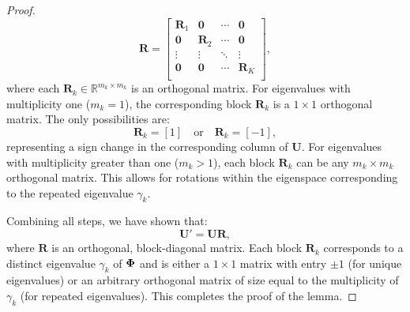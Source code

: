 \begin{proof}
    \[
        \mathbf{R} = \begin{bmatrix}
            \mathbf{R}_1 & \mathbf{0} & \cdots & \mathbf{0} \\
            \mathbf{0} & \mathbf{R}_2 & \cdots & \mathbf{0} \\
            \vdots & \vdots & \ddots & \vdots \\
            \mathbf{0} & \mathbf{0} & \cdots & \mathbf{R}_K \\
        \end{bmatrix},
    \]
    where each \( \mathbf{R}_k \in \mathbb{R}^{m_k \times m_k} \) is an orthogonal matrix. For eigenvalues with multiplicity one (\( m_k = 1 \)), the corresponding block \( \mathbf{R}_k \) is a \( 1 \times 1 \) orthogonal matrix. The only possibilities are:
    \[
        \mathbf{R}_k = [1] \quad \text{or} \quad \mathbf{R}_k = [-1],
    \]
    representing a sign change in the corresponding column of \( \mathbf{U} \). For eigenvalues with multiplicity greater than one (\( m_k > 1 \)), each block \( \mathbf{R}_k \) can be any \( m_k \times m_k \) orthogonal matrix. This allows for rotations within the eigenspace corresponding to the repeated eigenvalue \( \gamma_k \).
    
    Combining all steps, we have shown that:
    \[
        \mathbf{U}' = \mathbf{U} \mathbf{R},
    \]
    where \( \mathbf{R} \) is an orthogonal, block-diagonal matrix. Each block \( \mathbf{R}_k \) corresponds to a distinct eigenvalue \( \gamma_k \) of \( \boldsymbol{\Phi} \) and is either a \( 1 \times 1 \) matrix with entry \( \pm 1 \) (for unique eigenvalues) or an arbitrary orthogonal matrix of size equal to the multiplicity of \( \gamma_k \) (for repeated eigenvalues). This completes the proof of the lemma.
    




\end{proof}

